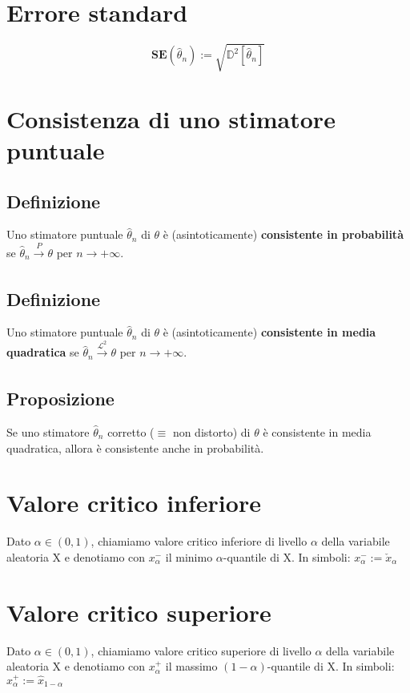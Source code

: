 \documentclass{article}
\begin{document}
\section*{Errore standard}
\[ \textbf{SE}(\hat{\theta}_{n}) := \sqrt{\mathbb{D}^{2}[\hat{\theta}_{n}]} \]

\section*{Consistenza di uno stimatore puntuale}
\subsection*{Definizione}
Uno stimatore puntuale $\hat{\theta}_{n}$ di $\theta$ è (asintoticamente) \textbf{consistente in probabilità} se $\hat{\theta}_{n} \xrightarrow[]{P} \theta$   per $n \to +\infty$.

\subsection*{Definizione}
Uno stimatore puntuale $\hat{\theta}_{n}$ di $\theta$ è (asintoticamente) \textbf{consistente in media quadratica} se $\hat{\theta}_{n} \xrightarrow[]{\mathcal{L}^{2}} \theta$   per $n \to +\infty$.

\subsection*{Proposizione}
Se uno stimatore $\hat{\theta}_{n}$ corretto ($\equiv$ non distorto) di $\theta$ è consistente in media quadratica, allora è consistente anche in probabilità.

\section*{Valore critico inferiore}
Dato $\alpha \in (0,1)$, chiamiamo valore critico inferiore di livello $\alpha$ della variabile aleatoria X e denotiamo con $x_{\alpha}^{-}$ il minimo $\alpha$-quantile di X. In simboli: $x_{\alpha}^{-} := \check{x}_{\alpha}$

\section*{Valore critico superiore}
Dato $\alpha \in (0,1)$, chiamiamo valore critico superiore di livello $\alpha$ della variabile aleatoria X e denotiamo con $x_{\alpha}^{+}$ il massimo $(1-\alpha)$-quantile di X. In simboli: $x_{\alpha}^{+} := \hat{x}_{1-\alpha}$
\end{document}
